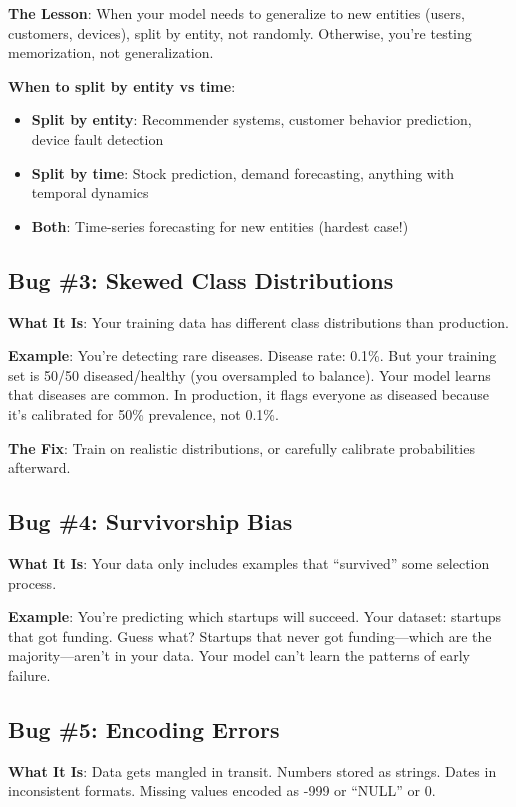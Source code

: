 \documentclass[11pt,oneside]{book}
\begin{document}
\textbf{The Lesson}: When your model needs to generalize to new entities (users, customers, devices), split by entity, not randomly. Otherwise, you're testing memorization, not generalization.

\textbf{When to split by entity vs time}:
\begin{itemize}
\item \textbf{Split by entity}: Recommender systems, customer behavior prediction, device fault detection
\item \textbf{Split by time}: Stock prediction, demand forecasting, anything with temporal dynamics
\item \textbf{Both}: Time-series forecasting for new entities (hardest case!)
\end{itemize}

\subsection{Bug \#3: Skewed Class Distributions}

\textbf{What It Is}: Your training data has different class distributions than production.

\textbf{Example}: You're detecting rare diseases. Disease rate: 0.1\%. But your training set is 50/50 diseased/healthy (you oversampled to balance). Your model learns that diseases are common. In production, it flags everyone as diseased because it's calibrated for 50\% prevalence, not 0.1\%.

\textbf{The Fix}: Train on realistic distributions, or carefully calibrate probabilities afterward.

\subsection{Bug \#4: Survivorship Bias}

\textbf{What It Is}: Your data only includes examples that ``survived'' some selection process.

\textbf{Example}: You're predicting which startups will succeed. Your dataset: startups that got funding. Guess what? Startups that never got funding—which are the majority—aren't in your data. Your model can't learn the patterns of early failure.

\subsection{Bug \#5: Encoding Errors}

\textbf{What It Is}: Data gets mangled in transit. Numbers stored as strings. Dates in inconsistent formats. Missing values encoded as -999 or ``NULL'' or 0.
\end{document}
